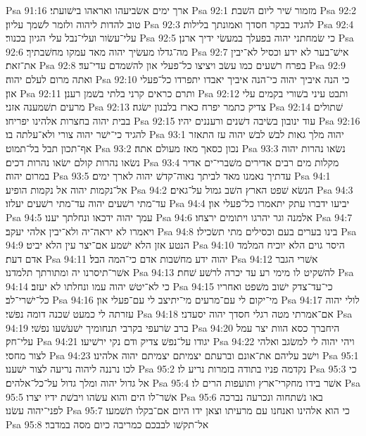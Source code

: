 Psa 91:16  ארך ימים אשׂביעהו ואראהו בישׁועתי׃
Psa 92:1  מזמור שׁיר ליום השׁבת׃
Psa 92:2  טוב להדות ליהוה ולזמר לשׁמך עליון׃
Psa 92:3  להגיד בבקר חסדך ואמונתך בלילות׃
Psa 92:4  עלי־עשׂור ועלי־נבל עלי הגיון בכנור׃
Psa 92:5  כי שׂמחתני יהוה בפעלך במעשׂי ידיך ארנן׃
Psa 92:6  מה־גדלו מעשׂיך יהוה מאד עמקו מחשׁבתיך׃
Psa 92:7  אישׁ־בער לא ידע וכסיל לא־יבין את־זאת׃
Psa 92:8  בפרח רשׁעים כמו עשׂב ויציצו כל־פעלי און להשׁמדם עדי־עד׃
Psa 92:9  ואתה מרום לעלם יהוה׃
Psa 92:10  כי הנה איביך יהוה כי־הנה איביך יאבדו יתפרדו כל־פעלי און׃
Psa 92:11  ותרם כראים קרני בלתי בשׁמן רענן׃
Psa 92:12  ותבט עיני בשׁורי בקמים עלי מרעים תשׁמענה אזני׃
Psa 92:13  צדיק כתמר יפרח כארז בלבנון ישׂגה׃
Psa 92:14  שׁתולים בבית יהוה בחצרות אלהינו יפריחו׃
Psa 92:15  עוד ינובון בשׂיבה דשׁנים ורעננים יהיו׃
Psa 92:16  להגיד כי־ישׁר יהוה צורי ולא־עלתה בו׃
Psa 93:1  יהוה מלך גאות לבשׁ לבשׁ יהוה עז התאזר אף־תכון תבל בל־תמוט׃
Psa 93:2  נכון כסאך מאז מעולם אתה׃
Psa 93:3  נשׂאו נהרות יהוה נשׂאו נהרות קולם ישׂאו נהרות דכים׃
Psa 93:4  מקלות מים רבים אדירים משׁברי־ים אדיר במרום יהוה׃
Psa 93:5  עדתיך נאמנו מאד לביתך נאוה־קדשׁ יהוה לארך ימים׃
Psa 94:1  אל־נקמות יהוה אל נקמות הופיע׃
Psa 94:2  הנשׂא שׁפט הארץ השׁב גמול על־גאים׃
Psa 94:3  עד־מתי רשׁעים יהוה עד־מתי רשׁעים יעלזו׃
Psa 94:4  יביעו ידברו עתק יתאמרו כל־פעלי און׃
Psa 94:5  עמך יהוה ידכאו ונחלתך יענו׃
Psa 94:6  אלמנה וגר יהרגו ויתומים ירצחו׃
Psa 94:7  ויאמרו לא יראה־יה ולא־יבין אלהי יעקב׃
Psa 94:8  בינו בערים בעם וכסילים מתי תשׂכילו׃
Psa 94:9  הנטע אזן הלא ישׁמע אם־יצר עין הלא יביט׃
Psa 94:10  היסר גוים הלא יוכיח המלמד אדם דעת׃
Psa 94:11  יהוה ידע מחשׁבות אדם כי־המה הבל׃
Psa 94:12  אשׁרי הגבר אשׁר־תיסרנו יה ומתורתך תלמדנו׃
Psa 94:13  להשׁקיט לו מימי רע עד יכרה לרשׁע שׁחת׃
Psa 94:14  כי לא־יטשׁ יהוה עמו ונחלתו לא יעזב׃
Psa 94:15  כי־עד־צדק ישׁוב משׁפט ואחריו כל־ישׁרי־לב׃
Psa 94:16  מי־יקום לי עם־מרעים מי־יתיצב לי עם־פעלי און׃
Psa 94:17  לולי יהוה עזרתה לי כמעט שׁכנה דומה נפשׁי׃
Psa 94:18  אם־אמרתי מטה רגלי חסדך יהוה יסעדני׃
Psa 94:19  ברב שׂרעפי בקרבי תנחומיך ישׁעשׁעו נפשׁי׃
Psa 94:20  היחברך כסא הוות יצר עמל עלי־חק׃
Psa 94:21  יגודו על־נפשׁ צדיק ודם נקי ירשׁיעו׃
Psa 94:22  ויהי יהוה לי למשׂגב ואלהי לצור מחסי׃
Psa 94:23  וישׁב עליהם את־אונם וברעתם יצמיתם יצמיתם יהוה אלהינו׃
Psa 95:1  לכו נרננה ליהוה נריעה לצור ישׁענו׃
Psa 95:2  נקדמה פניו בתודה בזמרות נריע לו׃
Psa 95:3  כי אל גדול יהוה ומלך גדול על־כל־אלהים׃
Psa 95:4  אשׁר בידו מחקרי־ארץ ותועפות הרים לו׃
Psa 95:5  אשׁר־לו הים והוא עשׂהו ויבשׁת ידיו יצרו׃
Psa 95:6  באו נשׁתחוה ונכרעה נברכה לפני־יהוה עשׂנו׃
Psa 95:7  כי הוא אלהינו ואנחנו עם מרעיתו וצאן ידו היום אם־בקלו תשׁמעו׃
Psa 95:8  אל־תקשׁו לבבכם כמריבה כיום מסה במדבר׃
